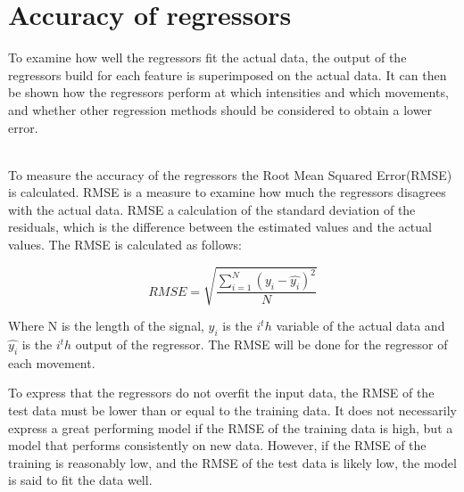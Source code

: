 \section{Accuracy of regressors}
To examine how well the regressors fit the actual data, the output of the regressors build for each feature is superimposed on the actual data. It can then be shown how the regressors perform at which intensities and which movements, and whether other regression methods should be considered to obtain a lower error. 

\\
To measure the accuracy of the regressors the Root Mean Squared Error(RMSE) is calculated. RMSE is a measure to examine how much the regressors disagrees with the actual data. RMSE a calculation of the standard deviation of the residuals, which is the difference between the estimated values and the actual values. The RMSE is calculated as follows:

\begin{equation}
RMSE = \sqrt{\frac{\sum\limits_{i=1}^N(y_i - \hat{y_i})^2}{N}}
\end{equation}

Where N is the length of the signal, $y_i$ is the $i^th$ variable of the actual data and $\hat{y_i}$ is the $i^th$ output of the regressor. The RMSE will be done for the regressor of each movement.

To express that the regressors do not overfit the input data, the RMSE of the test data must be lower than or equal to the training data. It does not necessarily express a great performing model if the RMSE of the training data is high, but a model that performs consistently on new data. However, if the RMSE of the training is reasonably low, and the RMSE of the test data is likely low, the model is said to fit the data well. 